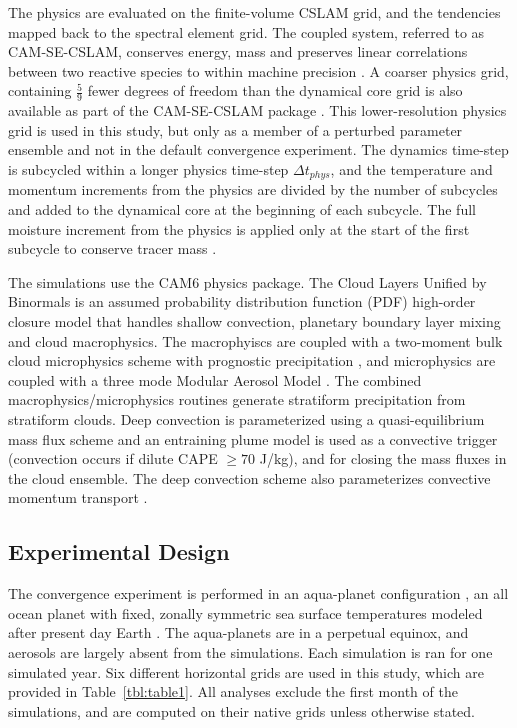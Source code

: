 \documentclass[times]{qjrms4}
\begin{document}
The physics are evaluated on the finite-volume CSLAM grid, and the tendencies mapped back to the spectral element grid. The coupled system, referred to as CAM-SE-CSLAM, conserves energy, mass and preserves linear correlations between two reactive species to within machine precision \citep{HL2018MWR}. A coarser physics grid, containing $\frac{5}{9}$ fewer degrees of freedom than the dynamical core grid is also available as part of the CAM-SE-CSLAM package \citep{HETAL2019JAMES}. This lower-resolution physics grid is used in this study, but only as a member of a perturbed parameter ensemble and not in the default convergence experiment. The dynamics time-step is subcycled within a longer physics time-step $\Delta t_{phys}$, and the temperature and momentum increments from the physics are divided by the number of subcycles and added to the dynamical core at the beginning of each subcycle. The full moisture increment from the physics is applied only at the start of the first subcycle to conserve tracer mass \citep[$ftype=2$ option in][]{LW2019JAMES}.

The simulations use the CAM6 physics package. The Cloud Layers Unified by Binormals \citep[CLUBB][]{GETAL2002JAS,BOG2013JCLIM} is an assumed probability distribution function (PDF) high-order closure model that handles shallow convection, planetary boundary layer mixing and cloud macrophysics. The macrophyiscs are coupled with a two-moment bulk cloud microphysics scheme with prognostic precipitation \citep{MG2}, and microphysics are coupled with a three mode Modular Aerosol Model \citep{MAM}. The combined macrophysics/microphysics routines generate stratiform precipitation from stratiform clouds. Deep convection is parameterized using a quasi-equilibrium mass flux scheme \citep{ZM1995AO} and an entraining plume model \citep[referred to as the dilute convective available potential energy, or {\em{dilute CAPE}} hereafter;][]{RB1992JAS, NRJ2008JC} is used as a convective trigger (convection occurs if dilute CAPE $\geq 70$ J/kg), and for closing the mass fluxes in the cloud ensemble. The deep convection scheme also parameterizes convective momentum transport \citep{RR2008JC}.

\subsection{Experimental Design}
 
The convergence experiment is performed in an aqua-planet configuration \citep{NH2000ASL,MWO2016JAMES}, an all ocean planet with fixed, zonally symmetric sea surface temperatures modeled after present day Earth \citep[$QOBS$ in][]{NH2000ASL}. The aqua-planets are in a perpetual equinox, and aerosols are largely absent from the simulations. Each simulation is ran for one simulated year. Six different horizontal grids are used in this study, which are provided in Table~\ref{tbl:table1}. All analyses exclude the first month of the simulations, and are computed on their native grids unless otherwise stated.
\end{document}
